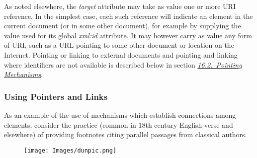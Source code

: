 As noted elsewhere, the {\itshape target}  attribute may take as value one or more URI reference. In the simplest case, each such reference will indicate an element in the current document (or in some other document), for example by supplying the value used for its global {\itshape xml:id} attribute. It may however carry as value any form of URI, such as a URL pointing to some other document or location on the Internet. Pointing or linking to external documents and pointing and linking where identifiers are not available is described below in section \textit{\hyperref[SAXP]{16.2.\ Pointing Mechanisms}}.
\subsubsection[{Using Pointers and Links}]{Using Pointers and Links}\label{SAPTEG}\par
As an example of the use of mechanisms which establish connections among elements, consider the practice (common in 18th century English verse and elsewhere) of providing footnotes citing parallel passages from classical authors. \begin{figure}[htbp]
\noindent\noindent\texttt{[image: Images/dunpic.png]}\end{figure}
